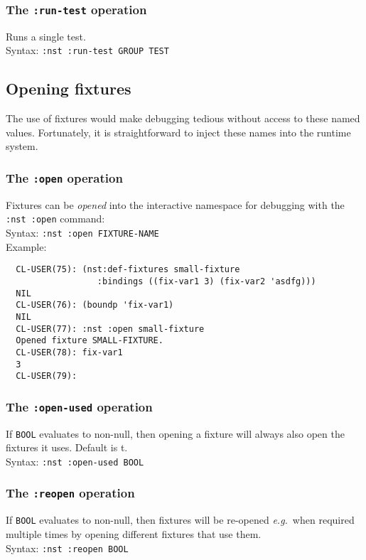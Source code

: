 \documentclass{article}
\begin{document}
\subsubsection{The \texttt{:run-test} operation}
%
Runs a single test.
\\ Syntax: \texttt{:nst :run-test GROUP TEST}

\subsection{Opening fixtures}
The use of fixtures would make debugging tedious without access to
these named values.  Fortunately, it is straightforward to inject
these names into the runtime system.

\subsubsection{The \texttt{:open} operation}
%
Fixtures can be \emph{opened} into the
interactive namespace for debugging with the
\texttt{:nst~:open} command:
\\ Syntax: \texttt{:nst :open FIXTURE-NAME}
\\ Example:
\begin{verbatim}
  CL-USER(75): (nst:def-fixtures small-fixture
                  :bindings ((fix-var1 3) (fix-var2 'asdfg)))
  NIL
  CL-USER(76): (boundp 'fix-var1)
  NIL
  CL-USER(77): :nst :open small-fixture
  Opened fixture SMALL-FIXTURE.
  CL-USER(78): fix-var1
  3
  CL-USER(79): \end{verbatim}

\subsubsection{The \texttt{:open-used} operation}
%
If \texttt{BOOL} evaluates to non-null, then opening a fixture will
always also open the fixtures it uses.  Default is t.
\\ Syntax: \texttt{:nst :open-used BOOL}

\subsubsection{The \texttt{:reopen} operation}
%
If \texttt{BOOL} evaluates to non-null, then fixtures will be
re-opened \emph{e.g.}\ when required multiple times by opening
different fixtures that use them.
\\ Syntax: \texttt{:nst :reopen BOOL}
\end{document}

